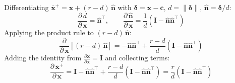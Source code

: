 \documentclass{article}
\newcommand{\pd}[2]{\dfrac{\partial\, #1}{\partial\, #2}}
\newcommand{\pdc}[2]{\frac{\partial #1}{\partial #2}}
\begin{document}
\begin{derivation}
Differentiating $\bar{\mathbf{x}}^+ = \mathbf{x} + (r - d)\,\hat{\mathbf{n}}$ with $\boldsymbol{\delta} = \mathbf{x} - \mathbf{c}$, $d = \|\boldsymbol{\delta}\|$, $\hat{\mathbf{n}} = \boldsymbol{\delta}/d$:
\begin{equation*}
    \pd{d}{\mathbf{x}} = \hat{\mathbf{n}}^\top,
    \qquad
    \pd{\hat{\mathbf{n}}}{\mathbf{x}} = \frac{1}{d}(\mathbf{I} - \hat{\mathbf{n}}\hat{\mathbf{n}}^\top)
\end{equation*}
Applying the product rule to $(r - d)\,\hat{\mathbf{n}}$:
\begin{equation*}
    \frac{\partial}{\partial\, \mathbf{x}}\left[(r - d)\,\hat{\mathbf{n}}\right] =
    -\hat{\mathbf{n}}\hat{\mathbf{n}}^\top + \frac{r-d}{d}(\mathbf{I} - \hat{\mathbf{n}}\hat{\mathbf{n}}^\top)
\end{equation*}
Adding the identity from $\pdc{\mathbf{x}}{\mathbf{x}} = \mathbf{I}$ and collecting terms:
\begin{equation*}
    \pd{\bar{\mathbf{x}}^+}{\mathbf{x}} =
    \mathbf{I} - \hat{\mathbf{n}}\hat{\mathbf{n}}^\top + \frac{r-d}{d}(\mathbf{I} - \hat{\mathbf{n}}\hat{\mathbf{n}}^\top)
    = \frac{r}{d}(\mathbf{I} - \hat{\mathbf{n}}\hat{\mathbf{n}}^\top)
\end{equation*}
\end{derivation}
\end{document}
